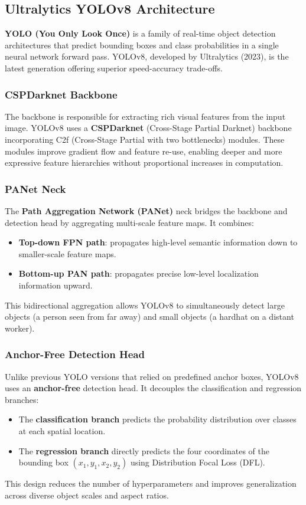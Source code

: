 \documentclass[12pt,a4paper]{report}
\begin{document}
\subsection{Ultralytics YOLOv8 Architecture}

\textbf{YOLO (You Only Look Once)} is a family of real-time object detection architectures that predict bounding boxes and class probabilities in a single neural network forward pass. YOLOv8, developed by Ultralytics (2023), is the latest generation offering superior speed-accuracy trade-offs.

\subsubsection*{CSPDarknet Backbone}
The backbone is responsible for extracting rich visual features from the input image. YOLOv8 uses a \textbf{CSPDarknet} (Cross-Stage Partial Darknet) backbone incorporating C2f (Cross-Stage Partial with two bottlenecks) modules. These modules improve gradient flow and feature re-use, enabling deeper and more expressive feature hierarchies without proportional increases in computation.

\subsubsection*{PANet Neck}
The \textbf{Path Aggregation Network (PANet)} neck bridges the backbone and detection head by aggregating multi-scale feature maps. It combines:
\begin{itemize}
    \item \textbf{Top-down FPN path}: propagates high-level semantic information down to smaller-scale feature maps.
    \item \textbf{Bottom-up PAN path}: propagates precise low-level localization information upward.
\end{itemize}
This bidirectional aggregation allows YOLOv8 to simultaneously detect large objects (a person seen from far away) and small objects (a hardhat on a distant worker).

\subsubsection*{Anchor-Free Detection Head}
Unlike previous YOLO versions that relied on predefined anchor boxes, YOLOv8 uses an \textbf{anchor-free} detection head. It decouples the classification and regression branches:
\begin{itemize}
    \item The \textbf{classification branch} predicts the probability distribution over classes at each spatial location.
    \item The \textbf{regression branch} directly predicts the four coordinates of the bounding box $(x_1, y_1, x_2, y_2)$ using Distribution Focal Loss (DFL).
\end{itemize}
This design reduces the number of hyperparameters and improves generalization across diverse object scales and aspect ratios.
\end{document}
